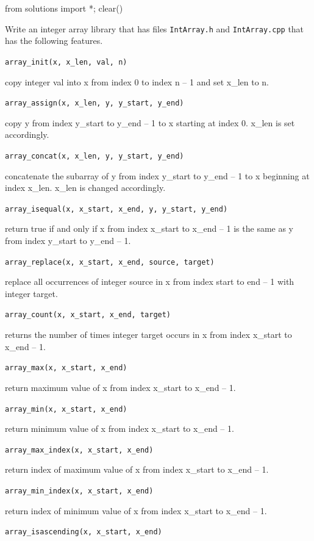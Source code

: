 \begin{python0}
from solutions import *; clear()
\end{python0}

Write an integer array library that has files \texttt{IntArray.h} and
\texttt{IntArray.cpp} that has the following features.

\texttt{array\_init(x, x\_len, val, n)}

copy integer val into x from index 0 to index n -- 1 and set x\_len to
n.

\texttt{array\_assign(x, x\_len, y, y\_start, y\_end)}

copy y from index y\_start to y\_end -- 1 to x starting at index 0.
x\_len is set accordingly.

\texttt{array\_concat(x, x\_len, y, y\_start, y\_end)}

concatenate the subarray of y from index y\_start to y\_end -- 1 to x
beginning at index x\_len. x\_len is changed accordingly.

\texttt{array\_isequal(x, x\_start, x\_end, y, y\_start, y\_end)}

return true if and only if x from index x\_start to x\_end -- 1 is the
same as y from index y\_start to y\_end -- 1.

\texttt{array\_replace(x, x\_start, x\_end, source, target)}

replace all occurrences of integer source in x from index start to end
-- 1 with integer target.

\texttt{array\_count(x, x\_start, x\_end, target)}

returns the number of times integer target occurs in x from index
x\_start to x\_end -- 1.

\texttt{array\_max(x, x\_start, x\_end)}

return maximum value of x from index x\_start to x\_end -- 1.

\texttt{array\_min(x, x\_start, x\_end)}

return minimum value of x from index x\_start to x\_end -- 1.

\texttt{array\_max\_index(x, x\_start, x\_end)}

return index of maximum value of x from index x\_start to x\_end -- 1.

\texttt{array\_min\_index(x, x\_start, x\_end)}

return index of minimum value of x from index x\_start to x\_end -- 1.

\texttt{array\_isascending(x, x\_start, x\_end)}

